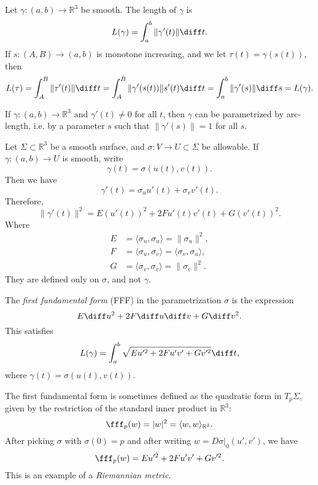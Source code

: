 \documentclass[12pt]{article}
\begin{document}
Let $\gamma : (a, b) \to \mathbb{R}^3$ be smooth. The length of $\gamma$ is
\[
L(\gamma) = \int_{a}^{b} \|\gamma'(t)\| \diff t
.\]
If $s: (A, B) \to (a, b)$ is monotone increasing, and we let $\tau(t) = \gamma(s(t))$, then
\[
L(\tau) = \int_{A}^{B} \|\tau'(t)\| \diff t = \int_{A}^{B} \|\gamma'(s(t)) \| s'(t) \diff t = \int_{a}^{b} \|\gamma'(s)\| \diff s = L(\gamma)
.\]

\begin{lemma}
	If $\gamma : (a, b) \to \mathbb{R}^3$ and $\gamma'(t) \neq 0$ for all $t$, then $\gamma$ can be parametrized by arc-length, i.e. by a parameter $s$ such that $\|\gamma'(s)\| = 1$ for all $s$.
\end{lemma}

Let $\Sigma \subset \mathbb{R}^3$ be a smooth surface, and $\sigma : V \to U \subset \Sigma$ be allowable. If $\gamma : (a, b) \to U$ is smooth, write
\[
\gamma(t) = \sigma(u(t), v(t))
.\]
Then we have
\[
\gamma'(t) = \sigma_u u'(t) + \sigma_v v'(t)
.\]
Therefore,
\[
\|\gamma'(t)\|^2 = E(u'(t))^2 + 2F u'(t) v'(t) + G (v'(t))^2
.\]
Where
\begin{align*}
	E &= \langle \sigma_u, \sigma_u \rangle = \|\sigma_u \|^2, \\
	F &= \langle \sigma_u, \sigma_v \rangle = \langle \sigma_v, \sigma_u \rangle, \\
	G &= \langle \sigma_v, \sigma_v \rangle = \|\sigma_v \|^2.
\end{align*}
They are defined only on $\sigma$, and not $\gamma$.

\begin{definition}
	The \emph{first fundamental form} (FFF) in the parametrization $\sigma$ is the expression
	\[
	E \diff u^2 + 2F \diff u \diff v + G \diff v^2
	.\]
	This satisfies
	\[
		L(\gamma) = \int_{a}^{b} \sqrt{E u'^2 + 2F u'v' + Gv'^2} \diff t
	,\]
	where $\gamma(t) = \sigma(u(t), v(t))$.
\end{definition}

\begin{remark}
	The first fundamental form is sometimes defined as the quadratic form in $T_p \Sigma$, given by the restriction of the standard inner product in $\mathbb{R}^3$:
	\[
	\fff_p(w) = |w|^2 = \langle w, w \rangle_{\mathbb{R}^3}
	.\]
	After picking $\sigma$ with $\sigma(0) = p$ and after writing $w = D\sigma|_0 (u', v')$, we have
	\[
	\fff_p(w) = E u'^2 + 2 F u'v' + G v'^2
	.\]
	This is an example of a \emph{Riemannian metric}.
\end{remark}
\end{document}
